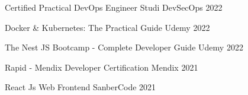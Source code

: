 

\begin{cvhonors}

  \cvhonor
    {Certified Practical DevOps Engineer} %
    {Studi DevSecOps} %
    {} %
    {2022} %

  \cvhonor
    {Docker \& Kubernetes: The Practical Guide} %
    {Udemy} %
    {} %
    {2022} %

  \cvhonor
    {The Nest JS Bootcamp - Complete Developer Guide} %
    {Udemy} %
    {} %
    {2022} %

  \cvhonor
    {Rapid - Mendix Developer Certification} %
    {Mendix} %
    {} %
    {2021} %

  \cvhonor
    {React Js Web Frontend} %
    {SanberCode} %
    {} %
    {2021} %

\end{cvhonors}